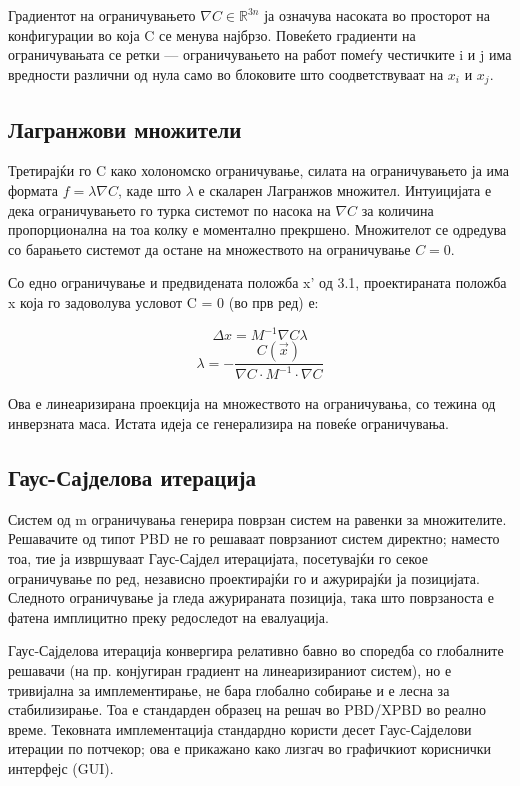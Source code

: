 Градиентот на ограничувањето $\nabla C \in \mathbb{R}^{3n}$ ја означува насоката во просторот на конфигурации во која C се менува најбрзо. Повеќето градиенти на ограничувањата се ретки — ограничувањето на работ помеѓу честичките i и j има вредности различни од нула само во блоковите што соодветствуваат на $x_i$ и $x_j$.

\subsection{Лагранжови множители}
Третирајќи го C како холономско ограничување, силата на ограничувањето ја има формата $f = \lambda \nabla C$, каде што $\lambda$ е скаларен Лагранжов множител. Интуицијата е дека ограничувањето го турка системот по насока на $\nabla C$ за количина пропорционална на тоа колку е моментално прекршено. Множителот се одредува со барањето системот да остане на множеството на ограничување $C = 0$.

Со едно ограничување и предвидената положба x' од 3.1, проектираната положба x која го задоволува условот C = 0 (во прв ред) е:

$$\Delta x = M^{-1} \nabla C \lambda $$
$$\lambda = -\frac{C(\vec{x})}{\nabla C \cdot M^{-1} \cdot \nabla C}$$

Ова е линеаризирана проекција на множеството на ограничувања, со тежина од инверзната маса. Истата идеја се генерализира на повеќе ограничувања.

\subsection{Гаус-Сајделова итерација}
Систем од m ограничувања генерира поврзан систем на равенки за множителите. Решавачите од типот PBD не го решаваат поврзаниот систем директно; наместо тоа, тие ја извршуваат Гаус-Сајдел итерацијата, посетувајќи го секое ограничување по ред, независно проектирајќи го и ажурирајќи ја позицијата. Следното ограничување ја гледа ажурираната позиција, така што поврзаноста е фатена имплицитно преку редоследот на евалуација.

Гаус-Сајделова итерација конвергира релативно бавно во споредба со глобалните решавачи (на пр. конјугиран градиент на линеаризираниот систем), но е тривијална за имплементирање, не бара глобално собирање и е лесна за стабилизирање. Тоа е стандарден образец на решач во PBD/XPBD во реално време. Тековната имплементација стандардно користи десет Гаус-Сајделови итерации по потчекор; ова е прикажано како лизгач во графичкиот кориснички интерфејс (GUI).

